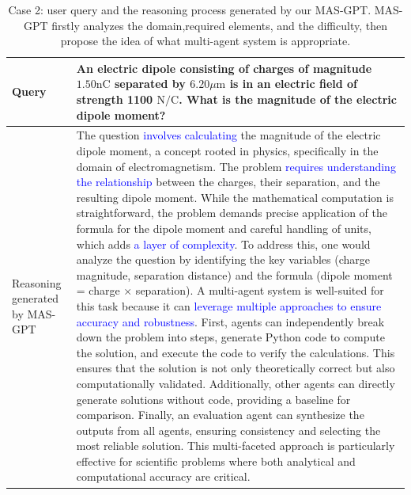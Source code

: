 \documentclass{article}
\theoremstyle{plain}
\theoremstyle{definition}
\theoremstyle{remark}
\begin{document}
\begin{table}[h]
    \centering
    \caption{Case 2: user query and the reasoning process generated by our MAS-GPT. MAS-GPT firstly analyzes the domain,required elements, and the difficulty, then propose the idea of what multi-agent system is appropriate.}
    \begin{tabular}{p{1.8cm}|p{14cm}}
    \toprule
        Query & An electric dipole consisting of charges of magnitude $1.50 \mathrm{nC}$ separated by $6.20 \mu \mathrm{m}$ is in an electric field of strength 1100 $\mathrm{N} / \mathrm{C}$. What is the magnitude of the electric dipole moment? \\
    \midrule
        Reasoning generated by MAS-GPT & The question \textcolor{blue}{involves calculating} the magnitude of the electric dipole moment, a concept rooted in physics, specifically in the domain of electromagnetism. The problem \textcolor{blue}{requires understanding the relationship} between the charges, their separation, and the resulting dipole moment. While the mathematical computation is straightforward, the problem demands precise application of the formula for the dipole moment and careful handling of units, which adds \textcolor{blue}{a layer of complexity}. \newline \newline To address this, one would analyze the question by identifying the key variables (charge magnitude, separation distance) and the formula (dipole moment = charge × separation). \newline \newline A multi-agent system is well-suited for this task because it can \textcolor{blue}{leverage multiple approaches to ensure accuracy and robustness}. First, agents can independently break down the problem into steps, generate Python code to compute the solution, and execute the code to verify the calculations. This ensures that the solution is not only theoretically correct but also computationally validated. Additionally, other agents can directly generate solutions without code, providing a baseline for comparison. Finally, an evaluation agent can synthesize the outputs from all agents, ensuring consistency and selecting the most reliable solution. This multi-faceted approach is particularly effective for scientific problems where both analytical and computational accuracy are critical.
\\
    \bottomrule
    \end{tabular}
    \label{tab:case2_query_reasoning}
\end{table}
\end{document}
